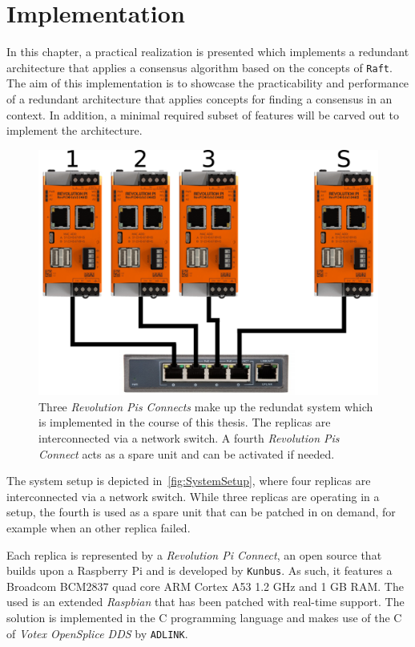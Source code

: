 \chapter{Implementation}
\label{cpt:Implementation}

In this chapter, a practical realization is presented which implements a redundant architecture that applies a consensus algorithm based on the concepts of \texttt{Raft}.
The aim of this implementation is to showcase the practicability and performance of a redundant architecture that applies  concepts for finding a consensus in an  context.
In addition, a minimal required subset of  features will be carved out to implement the architecture.
\\

\begin{figure}[!hb]
	\centering
	\includegraphics[width=0.7\linewidth]{images/setup}
	\caption{Three \textit{Revolution Pis Connects} make up the redundat system which is implemented in the course of this thesis. The replicas are interconnected via a network switch. A fourth \textit{Revolution Pis Connect} acts as a spare unit and can be activated if needed.}
	\label{fig:SystemSetup}
\end{figure}

The system setup is depicted in~\autoref{fig:SystemSetup}, where four replicas are interconnected via a network switch.
While three replicas are operating in a  setup, the fourth is used as a spare unit that can be patched in on demand, for example when an other replica failed.

Each replica is represented by a \textit{Revolution Pi Connect}, an open source  that builds upon a Raspberry Pi and is developed by \texttt{Kunbus}.
As such, it features a Broadcom BCM2837 quad core ARM Cortex A53 1.2 GHz  and 1 GB RAM.
The used  is an extended \textit{Raspbian}  that has been patched with real-time support.
The solution is implemented in the C programming language and makes use of the C  of \textit{Votex OpenSplice DDS} by \texttt{ADLINK}.

